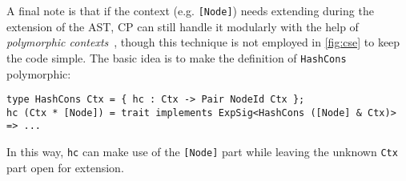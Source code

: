 A final note is that if the context (e.g. \lstinline{[Node]}) needs extending
during the extension of the AST, CP can still handle it modularly with the help
of \emph{polymorphic contexts}~\citep{zhang2021compositional}, though this
technique is not employed in \autoref{fig:cse} to keep the code simple. The
basic idea is to make the definition of \lstinline{HashCons} polymorphic:
\begin{lstlisting}
type HashCons Ctx = { hc : Ctx -> Pair NodeId Ctx };
hc (Ctx * [Node]) = trait implements ExpSig<HashCons ([Node] & Ctx)> => ...
\end{lstlisting}
In this way, \lstinline{hc} can make use of the \lstinline{[Node]} part while
leaving the unknown \lstinline{Ctx} part open for extension.
